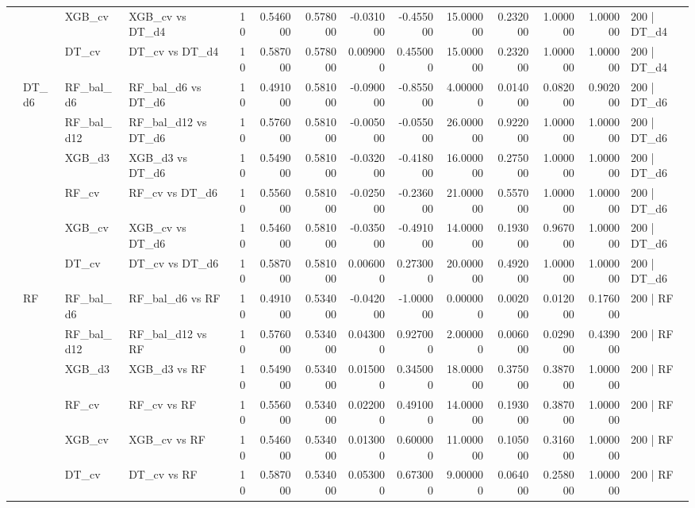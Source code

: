 \begin{tabular}{llllrrrrrrrrrl}
 &  & XGB_cv & XGB_cv vs DT_d4 & 10 & 0.546000 & 0.578000 & -0.031000 & -0.455000 & 15.000000 & 0.232000 & 1.000000 & 1.000000 & 200 | DT_d4 \\
 &  & DT_cv & DT_cv vs DT_d4 & 10 & 0.587000 & 0.578000 & 0.009000 & 0.455000 & 15.000000 & 0.232000 & 1.000000 & 1.000000 & 200 | DT_d4 \\
\cline{2-14}
 & \multirow[t]{6}{*}{DT_d6} & RF_bal_d6 & RF_bal_d6 vs DT_d6 & 10 & 0.491000 & 0.581000 & -0.090000 & -0.855000 & 4.000000 & 0.014000 & 0.082000 & 0.902000 & 200 | DT_d6 \\
 &  & RF_bal_d12 & RF_bal_d12 vs DT_d6 & 10 & 0.576000 & 0.581000 & -0.005000 & -0.055000 & 26.000000 & 0.922000 & 1.000000 & 1.000000 & 200 | DT_d6 \\
 &  & XGB_d3 & XGB_d3 vs DT_d6 & 10 & 0.549000 & 0.581000 & -0.032000 & -0.418000 & 16.000000 & 0.275000 & 1.000000 & 1.000000 & 200 | DT_d6 \\
 &  & RF_cv & RF_cv vs DT_d6 & 10 & 0.556000 & 0.581000 & -0.025000 & -0.236000 & 21.000000 & 0.557000 & 1.000000 & 1.000000 & 200 | DT_d6 \\
 &  & XGB_cv & XGB_cv vs DT_d6 & 10 & 0.546000 & 0.581000 & -0.035000 & -0.491000 & 14.000000 & 0.193000 & 0.967000 & 1.000000 & 200 | DT_d6 \\
 &  & DT_cv & DT_cv vs DT_d6 & 10 & 0.587000 & 0.581000 & 0.006000 & 0.273000 & 20.000000 & 0.492000 & 1.000000 & 1.000000 & 200 | DT_d6 \\
\cline{2-14}
 & \multirow[t]{6}{*}{RF} & RF_bal_d6 & RF_bal_d6 vs RF & 10 & 0.491000 & 0.534000 & -0.042000 & -1.000000 & 0.000000 & 0.002000 & 0.012000 & 0.176000 & 200 | RF \\
 &  & RF_bal_d12 & RF_bal_d12 vs RF & 10 & 0.576000 & 0.534000 & 0.043000 & 0.927000 & 2.000000 & 0.006000 & 0.029000 & 0.439000 & 200 | RF \\
 &  & XGB_d3 & XGB_d3 vs RF & 10 & 0.549000 & 0.534000 & 0.015000 & 0.345000 & 18.000000 & 0.375000 & 0.387000 & 1.000000 & 200 | RF \\
 &  & RF_cv & RF_cv vs RF & 10 & 0.556000 & 0.534000 & 0.022000 & 0.491000 & 14.000000 & 0.193000 & 0.387000 & 1.000000 & 200 | RF \\
 &  & XGB_cv & XGB_cv vs RF & 10 & 0.546000 & 0.534000 & 0.013000 & 0.600000 & 11.000000 & 0.105000 & 0.316000 & 1.000000 & 200 | RF \\
 &  & DT_cv & DT_cv vs RF & 10 & 0.587000 & 0.534000 & 0.053000 & 0.673000 & 9.000000 & 0.064000 & 0.258000 & 1.000000 & 200 | RF \\

\end{tabular}
